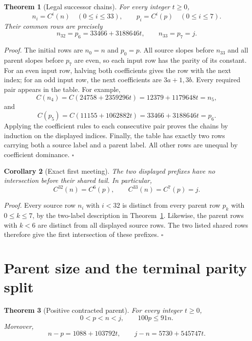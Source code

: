 \documentclass[11pt,letterpaper]{article}
\newtheorem{theorem}{Theorem}
\newtheorem{corollary}[theorem]{Corollary}
\newenvironment{proof}{\noindent\textit{Proof.}}{\hfill\(\square\)}
\begin{document}
\begin{theorem}[Legal successor chains]
\label{thm:chains}
For every integer \(t\ge0\),
\[
n_i=C^i(n)\quad(0\le i\le33),\qquad
p_i=C^i(p)\quad(0\le i\le7).
\]
Their common rows are precisely
\[
n_{32}=p_6=33466+3188646t,\qquad
n_{33}=p_7=j.
\]
\end{theorem}

\begin{proof}
The initial rows are \(n_0=n\) and \(p_0=p\).
All source slopes before \(n_{33}\) and all parent slopes before \(p_7\)
are even, so each input row has the parity of its constant.
For an even input row, halving both coefficients gives the row with the
next index; for an odd input row, the next coefficients are \(3a+1,3b\).
Every required pair appears in the table. For example,
\[
C(n_4)=C(24758+2359296t)=12379+1179648t=n_5,
\]
and
\[
C(p_5)=C(11155+1062882t)=33466+3188646t=p_6.
\]
Applying the coefficient rules to each consecutive pair proves the chains
by induction on the displayed indices.
Finally, the table has exactly two rows carrying both a source label and
a parent label. All other rows are unequal by coefficient dominance.
\end{proof}

\begin{corollary}[Exact first meeting]
\label{cor:first}
The two displayed prefixes have no intersection before their shared tail.
In particular,
\[
C^{32}(n)=C^6(p),\qquad C^{33}(n)=C^7(p)=j.
\]
\end{corollary}

\begin{proof}
Every source row \(n_i\) with \(i<32\) is distinct from every parent row
\(p_k\) with \(0\le k\le7\), by the two-label description in
Theorem~\ref{thm:chains}. Likewise, the parent rows with \(k<6\) are
distinct from all displayed source rows. The two listed shared rows
therefore give the first intersection of these prefixes.
\end{proof}

\section{Parent size and the terminal parity split}

\begin{theorem}[Positive contracted parent]
\label{thm:parent}
For every integer \(t\ge0\),
\[
0<p<n<j,\qquad 100p\le91n.
\]
Moreover,
\[
n-p=1088+103792t,\qquad j-n=5730+545747t.
\]
\end{theorem}
\end{document}
